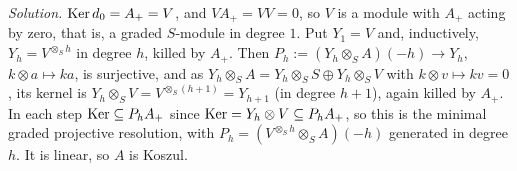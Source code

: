 \begin{hidden}
\emph{Solution.}
$\operatorname{Ker}\nolimits d_0=A_+=V$, and $VA_+=VV=0$, so $V$ is a module with $A_+$ acting by zero, that is, a graded $S$-module in degree $1$.
Put $Y_1=V$ and, inductively, $Y_h=V^{\otimes_Sh}$ in degree $h$, killed by $A_+$.
Then $P_h:=(Y_h\otimes_SA)(-h)\to Y_h$, $k\otimes a\mapsto ka$, is surjective, and as $Y_h\otimes_SA=Y_h\otimes_SS\oplus Y_h\otimes_SV$ with $k\otimes v\mapsto kv=0$, its kernel is $Y_h\otimes_SV=V^{\otimes_S(h+1)}=Y_{h+1}$ (in degree $h+1$), again killed by $A_+$.
In each step $\operatorname{Ker}\nolimits\subseteq P_hA_+$ since $\operatorname{Ker}\nolimits=Y_h\otimes V\subseteq P_hA_+$, so this is the minimal graded projective resolution, with $P_h=(V^{\otimes_Sh}\otimes_SA)(-h)$ generated in degree $h$.
It is linear, so $A$ is Koszul.
\end{hidden}

